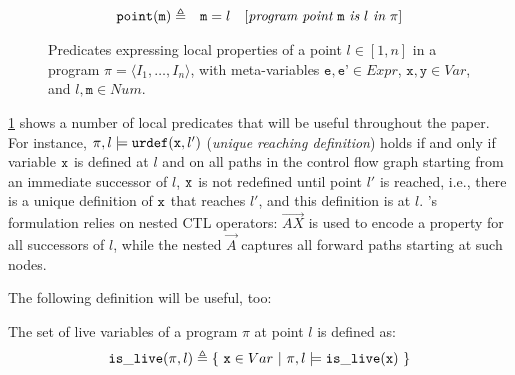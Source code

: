 \begin{figure}[hb]
\begin{small}
\begin{eqnarray*}
\text{${\tt point}$}(\texttt{m}) & \triangleq & \texttt{m}=l ~~~ [\textit{program point} ~ \text{${\tt m}$} ~ \textit{is} ~ l ~ \textit{in} ~ \pi]
\end{eqnarray*}
\vspace{-4mm}
\end{small}
\caption{\label{fig:osr-loc-pred}Predicates expressing local properties of a point $l\in [1,n]$ in a program $\pi=\langle I_1,\ldots,I_n\rangle$, with meta-variables $\texttt{e},\texttt{e'}\in Expr$, $\texttt{x}, \texttt{y}\in Var$, and $l, \texttt{m}\in Num$.}
\end{figure}

\myfigure\ref{fig:osr-loc-pred} shows a number of local predicates that will be useful throughout the paper. For instance, $\pi,l\models \text{${\tt urdef}$}(\text{${\tt x}$}, l')$ ({\em unique reaching definition}) holds if and only if variable $\text{${\tt x}$}$ is defined at $l$ and on all paths in the control flow graph starting from an immediate successor of $l$, $\text{${\tt x}$}$ is not redefined until point $l'$ is reached, i.e., there is a unique definition of $\text{${\tt x}$}$ that reaches $l'$, and this definition is at $l$. \ureachdef's formulation relies on nested CTL operators: $\overrightarrow{AX}$ is used to encode a property for all successors of $l$, while the nested $\overrightarrow{A}$ captures all forward paths starting at such nodes.

The following definition will be useful, too:

\begin{definition}
\label{de:live-var}
The set of live variables of a program $\pi$ at point $l$ is defined as:
\vspace{-1mm}
\begin{equation*}
\text{${\tt is\_live}$}(\pi,l) \triangleq \{ ~ \text{${\tt x}$}\in Var ~ | ~ \pi, l\models \text{${\tt is\_live}$}(\text{${\tt x}$}) ~ \}
\end{equation*}
\end{definition}


